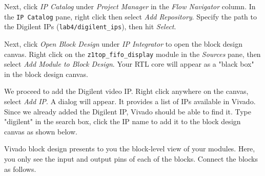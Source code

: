 \documentclass[11pt]{article}
\begin{document}
Next, click \emph{IP Catalog} under \emph{Project Manager} in the \emph{Flow Navigator} column.
In the \texttt{IP Catalog} pane, right click then select \emph{Add Repository}. Specify the path
to the Digilent IPs (\verb|lab4/digilent_ips|), then hit \emph{Select}.

Next, click \emph{Open Block Design} under \emph{IP Integrator} to open the block design canvas.
Right click on the \verb|z1top_fifo_display| module in the \textit{Sources} pane, then
select \emph{Add Module to Block Design}. Your RTL core will appear as a "black box" in the
block design canvas.

\begin{center}
\end{center}

We proceed to add the Digilent video IP. Right click anywhere on the canvas, select \emph{Add IP}.
A dialog will appear. It provides a list of IPs available in Vivado. Since we already added
the Digilent IP, Vivado should be able to find it. Type "digilent" in the search box,
click the IP name to add it to the block design canvas as shown below.

\begin{center}
\end{center}

Vivado block design presents to you the block-level view of your modules. Here, you only see the input and output pins of each of the blocks. Connect the blocks as follows.
\end{document}

